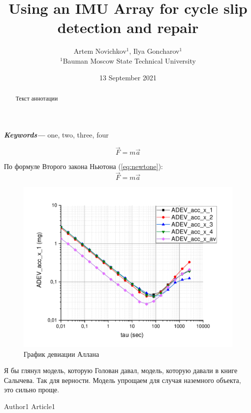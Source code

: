 \documentclass{article}      %
\title{Using an IMU Array for cycle slip detection and repair}  %
\author{Artem Novichkov$^{1}$, Ilya Goncharov$^{1}$ \\
	\small $^{1}$Bauman Moscow State Technical University
}  %
\date{13 September 2021}     %
\providecommand{\keywords}[1]
{
	\small
	\textbf{\textit{Keywords---}} #1
}
\begin{document}
\maketitle                   %

\tableofcontents

\begin{abstract}
	Текст аннотации
\end{abstract}

\keywords{one, two, three, four}

$$\vec{F} = m\vec{a}$$

По формуле Второго закона Ньютона (\ref{eq:newtone}):
\begin{equation}
	\vec{F} = m\vec{a}
	\label{eq:newtone}
\end{equation}









\begin{figure}[ht]
	\centering
	\includegraphics[width=0.9\linewidth]{acc_x_adev.pdf}
	\caption{График девиации Аллана}
	\label{fig:mpr}
\end{figure}

\begin{em}
	Я бы глянул модель, которую Голован давал, модель, которую давали в книге Салычева. Так для верности. Модель упрощаем для случая наземного объекта, это сильно проще. 
\end{em}





\begin{thebibliography}{00}
	 Author1 Article1
\end{thebibliography}
\end{document}
